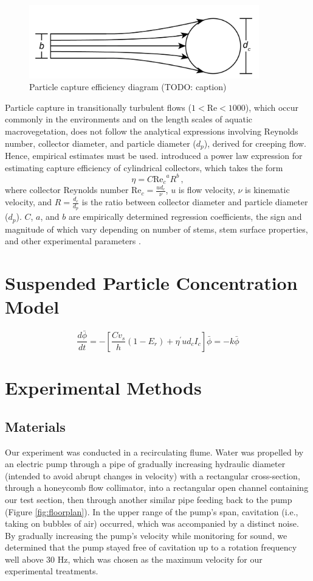 \documentclass[parskip=full-]{scrreprt}
\newcommand\Rey{\mathrm{Re}}
\begin{document}
\begin{figure}[htbp]
\includegraphics[width=10cm]{pics/collectorefficiency.png}
\centering
\caption{Particle capture efficiency diagram (TODO: caption)} \label{fig:capeff}
\end{figure}

Particle capture in transitionally turbulent flows (\(1<\Rey<1000\)), which occur commonly in the environments and on the length scales of aquatic macrovegetation, does not follow the analytical expressions involving Reynolds number, collector diameter, and particle diameter (\(d_p\)), derived for creeping flow. Hence, empirical estimates must be used. \citet{Palmer_2004} introduced a power law expression for estimating capture efficiency of cylindrical collectors, which takes the form \[\eta=C{\Rey_c}^{a}R^{b}\,,\] where collector Reynolds number \(\Rey_c=\frac{ud_c}{\nu}\), \(u\) is flow velocity, \(\nu\) is kinematic velocity, and \(R=\frac{d_c}{d_p}\) is the ratio between collector diameter and particle diameter (\(d_p\)). \(C\), \(a\), and \(b\) are empirically determined regression coefficients, the sign and magnitude of which vary depending on number of stems, stem surface properties, and other experimental parameters \citep[e.g.,][]{Palmer_2004, Fauria_2015}.

\section{Suspended Particle Concentration Model}

\[\frac{d\bar{\phi}}{dt} = -[\frac{Cv_s}{h}(1-E_r) + \eta^{\prime}ud_cI_c]\bar{\phi} = -k\bar{\phi}\]

\section{Experimental Methods}

\subsection{Materials}

Our experiment was conducted in a recirculating flume. Water was propelled by an electric pump through a pipe of gradually increasing hydraulic diameter (intended to avoid abrupt changes in velocity) with a rectangular cross-section, through a honeycomb flow collimator, into a rectangular open channel containing our test section, then through another similar pipe feeding back to the pump (Figure \ref{fig:floorplan}). In the upper range of the pump's span, cavitation (i.e., taking on bubbles of air) occurred, which was accompanied by a distinct noise. By gradually increasing the pump's velocity while monitoring for sound, we determined that the pump stayed free of cavitation up to a rotation frequency well above 30 Hz, which was chosen as the maximum velocity for our experimental treatments.
\end{document}
